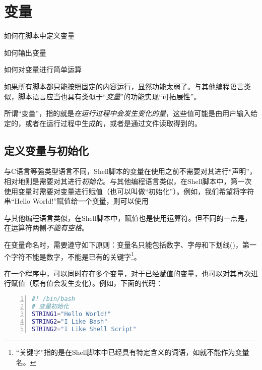 \section{变量}\label{sec:变量}

\begin{Abstract}
    \item 如何在脚本中定义变量
    \item 如何输出变量
    \item 如何对变量进行简单运算
\end{Abstract}


如果所有脚本都只能按照固定的内容运行，显然功能太弱了。与其他编程语言类似，脚本语言应当也具有类似于“\emph{变量}”的功能实现“可拓展性”。

所谓“变量”，指的就是\emph{在运行过程中会发生变化的量}，这些值可能是由用户输入给定的，或者在运行过程中生成的，或者是通过文件读取得到的。

\subsection{定义变量与初始化}\label{subsec:变量-定义变量与初始化}

与C语言等强类型语言不同，Shell脚本的变量在使用之前不需要对其进行“声明”，相对地则是需要对其进行\emph{初始化}。与其他编程语言类似，在Shell脚本中，第一次使用变量时需要对变量进行赋值（也可以叫做“初始化”）。例如，我们希望将字符串“Hello World!”赋值给一个变量，则可以使用

\begin{attention}
    与其他编程语言类似，在Shell脚本中，赋值也是使用\code{=}运算符。但不同的一点是，在运算符两侧\emph{不能有空格}。

    在变量命名时，需要遵守如下原则：变量名只能包括数字、字母和下划线(\code{\_})，第一个字符不能是数字，不能是已有的关键字\footnote{“关键字”指的是在Shell脚本中已经具有特定含义的词语，如就不能作为变量名。}。
\end{attention}

在一个程序中，可以同时存在多个变量，对于已经赋值的变量，也可以对其再次进行赋值（原有值会发生变化）。例如，下面的代码：

\begin{lstlisting}[language=bash,caption=variable,numbers=left]
#! /bin/bash
# 变量初始化
STRING1="Hello World!"
STRING2="I Like Bash"
STRING2="I Like Shell Script"
\end{lstlisting}

